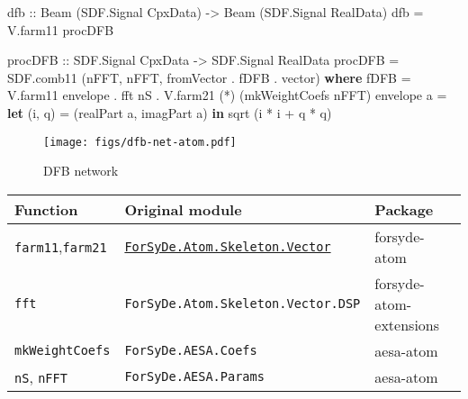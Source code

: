 \documentclass[
  a4paper,
]{article}
\newenvironment{Shaded}{}{}
\newcommand{\DataTypeTok}[1]{\textcolor[rgb]{0.56,0.13,0.00}{#1}}
\newcommand{\FunctionTok}[1]{\textcolor[rgb]{0.02,0.16,0.49}{#1}}
\newcommand{\KeywordTok}[1]{\textcolor[rgb]{0.00,0.44,0.13}{\textbf{#1}}}
\newcommand{\NormalTok}[1]{#1}
\newcommand{\OtherTok}[1]{\textcolor[rgb]{0.00,0.44,0.13}{#1}}
\begin{document}
\begin{Shaded}
\begin{Highlighting}[numbers=left,,firstnumber=344,]
\OtherTok{dfb ::} \DataTypeTok{Beam}\NormalTok{ (}\DataTypeTok{SDF.Signal} \DataTypeTok{CpxData}\NormalTok{)}
    \OtherTok{->} \DataTypeTok{Beam}\NormalTok{ (}\DataTypeTok{SDF.Signal} \DataTypeTok{RealData}\NormalTok{)}
\NormalTok{dfb }\FunctionTok{=}\NormalTok{ V.farm11 procDFB}

\OtherTok{procDFB ::} \DataTypeTok{SDF.Signal} \DataTypeTok{CpxData} \OtherTok{->} \DataTypeTok{SDF.Signal} \DataTypeTok{RealData}
\NormalTok{procDFB }\FunctionTok{=}\NormalTok{ SDF.comb11 (nFFT, nFFT, fromVector }\FunctionTok{.}\NormalTok{ fDFB }\FunctionTok{.}\NormalTok{ vector)}
  \KeywordTok{where}
\NormalTok{    fDFB       }\FunctionTok{=}\NormalTok{ V.farm11 envelope }\FunctionTok{.}\NormalTok{ fft nS }\FunctionTok{.}\NormalTok{ V.farm21 (}\FunctionTok{*}\NormalTok{) (mkWeightCoefs nFFT)}
\NormalTok{    envelope a }\FunctionTok{=} \KeywordTok{let}\NormalTok{ (i, q) }\FunctionTok{=}\NormalTok{ (realPart a, imagPart a)}
                 \KeywordTok{in} \FunctionTok{sqrt}\NormalTok{ (i }\FunctionTok{*}\NormalTok{ i }\FunctionTok{+}\NormalTok{ q }\FunctionTok{*}\NormalTok{ q)}
\end{Highlighting}
\end{Shaded}

\begin{figure}
\hypertarget{fig:dfb-net-atom}{%
\centering
\texttt{[image: figs/dfb-net-atom.pdf]}
\caption{DFB network}\label{fig:dfb-net-atom}
}
\end{figure}

\begin{longtable}[]{@{}lll@{}}
\toprule
Function & Original module & Package\tabularnewline
\midrule
\endhead
\texttt{farm11},\texttt{farm21} &
\href{https://forsyde.github.io/forsyde-atom/api/ForSyDe-Atom-Skeleton-Vector.html}{\texttt{ForSyDe.Atom.Skeleton.Vector}}
& forsyde-atom\tabularnewline
\texttt{fft} & \texttt{ForSyDe.Atom.Skeleton.Vector.DSP} &
forsyde-atom-extensions\tabularnewline
\texttt{mkWeightCoefs} & \texttt{ForSyDe.AESA.Coefs} &
aesa-atom\tabularnewline
\texttt{nS}, \texttt{nFFT} & \texttt{ForSyDe.AESA.Params} &
aesa-atom\tabularnewline
\bottomrule
\end{longtable}
\end{document}

